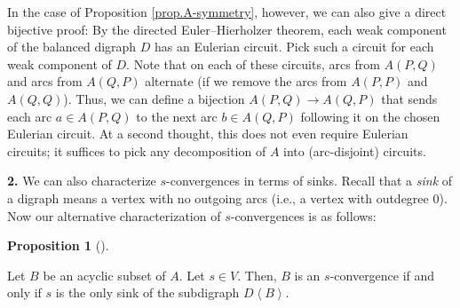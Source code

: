 \documentclass[numbers=enddot,12pt,final,onecolumn,notitlepage]{scrartcl}%
\theoremstyle{definition}
\newtheorem{prop}[theo]{Proposition}
\newenvironment{proposition}[1][]
{\begin{prop}[#1]\begin{leftbar}}
{\end{leftbar}\end{prop}}
\theoremstyle{plainsl}
\begin{document}
In the case of Proposition \ref{prop.A-symmetry}, however, we can also give a
direct bijective proof: By the directed Euler--Hierholzer theorem, each weak
component of the balanced digraph $D$ has an Eulerian circuit. Pick such a
circuit for each weak component of $D$. Note that on each of these circuits,
arcs from $A\left(  P,Q\right)  $ and arcs from $A\left(  Q,P\right)  $
alternate (if we remove the arcs from $A\left(  P,P\right)  $ and $A\left(
Q,Q\right)  $). Thus, we can define a bijection $A\left(  P,Q\right)
\rightarrow A\left(  Q,P\right)  $ that sends each arc $a\in A\left(
P,Q\right)  $ to the next arc $b\in A\left(  Q,P\right)  $ following it on the
chosen Eulerian circuit. At a second thought, this does not even require
Eulerian circuits; it suffices to pick any decomposition of $A$ into
(arc-disjoint) circuits.

\bigskip

\textbf{2.} We can also characterize $s$-convergences in terms of sinks.
Recall that a \emph{sink} of a digraph means a vertex with no outgoing arcs
(i.e., a vertex with outdegree $0$). Now our alternative characterization of
$s$-convergences is as follows:

\begin{proposition}
\label{prop.s-conv.2}Let $B$ be an acyclic subset of $A$. Let $s\in V$. Then,
$B$ is an $s$-convergence if and only if $s$ is the only sink of the
subdigraph $D\left\langle B\right\rangle $.
\end{proposition}
\end{document}
